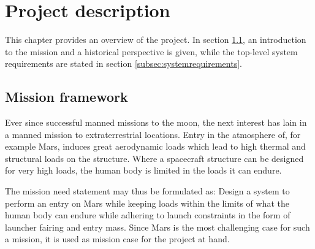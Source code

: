 \section{Project description}\label{cha:project_description}%
This chapter provides an overview of the project. In section \ref{subsec:missionframework}, an introduction to the mission and a historical perspective is given, while the top-level system requirements are stated in section \ref{subsec:systemrequirements}.

\subsection{Mission framework} 
\label{subsec:missionframework}
Ever since successful manned missions to the moon, the next interest has lain in a manned mission to extraterrestrial locations. Entry in the atmosphere of, for example Mars, induces great aerodynamic loads which lead to high thermal and structural loads on the structure. Where a spacecraft structure can be designed for very high loads, the human body is limited in the loads it can endure. 

The mission need statement may thus be formulated as: Design a system to perform an entry on Mars while keeping loads within the limits of what the human body can endure while adhering to launch constraints in the form of launcher fairing and entry mass. Since Mars is the most challenging case for such a mission, it is used as mission case for the project at hand. \cite{projectguide}



